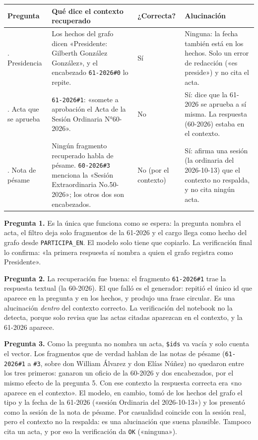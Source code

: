 \documentclass[10pt,letterpaper]{article}
\begin{document}
\begin{center}\small
\begin{tabular}{@{}>{\raggedright\arraybackslash}p{}>{\raggedright\arraybackslash}p{}>{\raggedright\arraybackslash}p{}>{\raggedright\arraybackslash}p{}@{}}
\toprule
Pregunta & Qué dice el contexto recuperado & ¿Correcta? & Alucinación \\
\midrule
1. Presidencia &
Los hechos del grafo dicen «Presidente: Gilberth González González», y el encabezado \texttt{61-2026\#0} lo repite. &
Sí &
Ninguna: la fecha también está en los hechos. Solo un error de redacción («es preside») y no cita el acta. \\
\addlinespace
2. Acta que se aprueba &
\texttt{61-2026\#1}: «somete a aprobación el Acta de la Sesión Ordinaria N°60-2026». &
No &
Sí: dice que la 61-2026 se aprueba a sí misma. La respuesta (60-2026) estaba en el contexto. \\
\addlinespace
3. Nota de pésame &
Ningún fragmento recuperado habla de pésame. \texttt{60-2026\#3} menciona la «Sesión Extraordinaria No.50-2026»;
los otros dos son encabezados. &
No (por el contexto) &
Sí: afirma una sesión (la ordinaria del 2026-10-13) que el contexto no respalda, y no cita ningún acta. \\
\bottomrule
\end{tabular}
\end{center}

\textbf{Pregunta 1.} Es la única que funciona como se espera: la pregunta nombra el acta, el filtro deja
solo fragmentos de la 61-2026 y el cargo llega como hecho del grafo desde \texttt{PARTICIPA\_EN}. El modelo
solo tiene que copiarlo. La verificación final lo confirma: «la primera respuesta sí nombra a quien el
grafo registra como Presidente».

\textbf{Pregunta 2.} La recuperación fue buena: el fragmento \texttt{61-2026\#1} trae la respuesta textual
(la 60-2026). El que falló es el generador: repitió el único id que aparece en la pregunta y en los
hechos, y produjo una frase circular. Es una alucinación \emph{dentro} del contexto correcto. La
verificación del notebook no la detecta, porque solo revisa que las actas citadas aparezcan en el
contexto, y la 61-2026 aparece.

\textbf{Pregunta 3.} Como la pregunta no nombra un acta, \texttt{\$ids} va vacía y solo cuenta el vector.
Los fragmentos que de verdad hablan de las notas de pésame (\texttt{61-2026\#1} a \texttt{\#3}, sobre don
William Álvarez y don Elías Núñez) no quedaron entre los tres primeros: ganaron un oficio de la
60-2026 y dos encabezados, por el mismo efecto de la pregunta 5. Con ese contexto la respuesta correcta
era «no aparece en el contexto». El modelo, en cambio, tomó de los hechos del grafo el tipo y la fecha de
la 61-2026 («sesión Ordinaria del 2026-10-13») y los presentó como la sesión de la nota de pésame. Por
casualidad coincide con la sesión real, pero el contexto no la respalda: es una alucinación que suena
plausible. Tampoco cita un acta, y por eso la verificación da \texttt{OK} («ninguna»).
\end{document}
